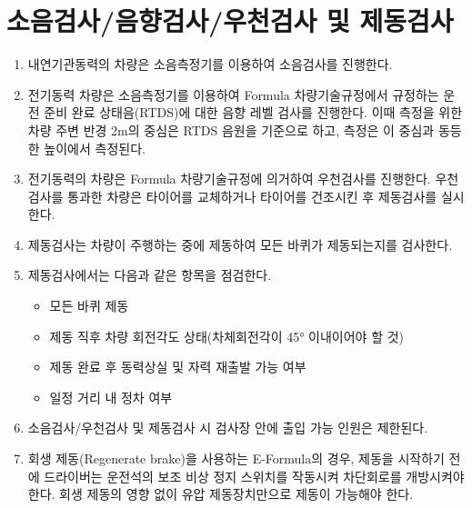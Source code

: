\documentclass[final,a4paper,10pt]{report}
\begin{document}
\section{소음검사/음향검사/우천검사 및 제동검사}\label{rule:formula-competition.noise-rain-brake-tests}
\begin{enumerate}
  \item\label{rule:formula-competition.noise-rain-brake-tests.ice-noise-test} 내연기관동력의 차량은 소음측정기를 이용하여 소음검사를 진행한다.
  \item\label{rule:formula-competition.noise-rain-brake-tests.ev-rtds-sound-test} 전기동력 차량은 소음측정기를 이용하여 Formula 차량기술규정에서 규정하는 운전 준비 완료 상태음(RTDS)에 대한 음향 레벨 검사를 진행한다. 이때 측정을 위한 차량 주변 반경 2m의 중심은 RTDS 음원을 기준으로 하고, 측정은 이 중심과 동등한 높이에서 측정된다.
  \item\label{rule:formula-competition.noise-rain-brake-tests.ev-rain-test} 전기동력의 차량은 Formula 차량기술규정에 의거하여 우천검사를 진행한다. 우천검사를 통과한 차량은 타이어를 교체하거나 타이어를 건조시킨 후 제동검사를 실시한다.
  \item\label{rule:formula-competition.noise-rain-brake-tests.all-wheel-brake-check} 제동검사는 차량이 주행하는 중에 제동하여 모든 바퀴가 제동되는지를 검사한다.
  \item\label{rule:formula-competition.noise-rain-brake-tests.brake-test-pass-criteria} 제동검사에서는 다음과 같은 항목을 점검한다.
    \begin{itemize}
      \item 모든 바퀴 제동
      \item 제동 직후 차량 회전각도 상태(차체회전각이 45° 이내이어야 할 것)
      \item 제동 완료 후 동력상실 및 자력 재출발 가능 여부
      \item 일정 거리 내 정차 여부
    \end{itemize}
  \item\label{rule:formula-competition.noise-rain-brake-tests.limited-test-area-access} 소음검사/우천검사 및 제동검사 시 검사장 안에 출입 가능 인원은 제한된다.
  \item\label{rule:formula-competition.noise-rain-brake-tests.regen-brake-shutdown-switch} 회생 제동(Regenerate brake)을 사용하는 E-Formula의 경우, 제동을 시작하기 전에 드라이버는 운전석의 보조 비상 정지 스위치를 작동시켜 차단회로를 개방시켜야 한다. 회생 제동의 영향 없이 유압 제동장치만으로 제동이 가능해야 한다.
\end{enumerate}
\end{document}
